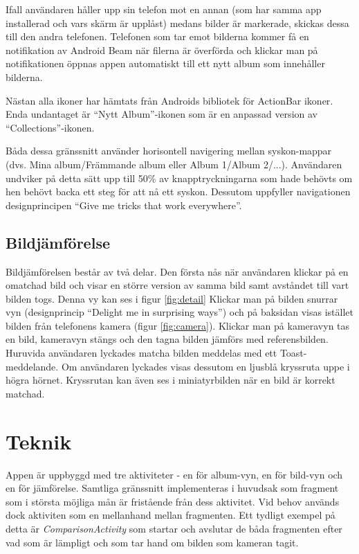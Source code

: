 \documentclass[11px, a4paper]{article}
\begin{document}
	Ifall användaren håller upp sin telefon mot en annan (som har samma app installerad och vars skärm är upplåst) medans bilder är markerade, skickas dessa till den andra telefonen. Telefonen som tar emot bilderna kommer få en notifikation av Android Beam när filerna är överförda och klickar man på notifikationen öppnas appen automatiskt till ett nytt album som innehåller bilderna.

	Nästan alla ikoner har hämtats från Androids bibliotek för ActionBar ikoner\cite{Icons}. Enda undantaget är ``Nytt Album''-ikonen som är en anpassad version av ``Collections''-ikonen.

	Båda dessa gränssnitt använder horisontell navigering mellan syskon-mappar (dvs. Mina album/Främmande album eller Album 1/Album 2/...). Användaren undviker på detta sätt upp till 50\% av knapptryckningarna som hade behövts om hen behövt backa ett steg för att nå ett syskon. Dessutom uppfyller navigationen designprincipen ``Give me tricks that work everywhere''\cite{Principles}.



\subsection{Bildjämförelse}
	Bildjämförelsen består av två delar. Den första nås när användaren klickar på en omatchad bild och visar en större version av samma bild samt avståndet till vart bilden togs. Denna vy kan ses i figur \ref{fig:detail} Klickar man på bilden snurrar vyn (designprincip ``Delight me in surprising ways''\cite{Principles}) och på baksidan visas istället bilden från telefonens kamera (figur \ref{fig:camera}). Klickar man på kameravyn tas en bild, kameravyn stängs och den tagna bilden jämförs med referensbilden. Huruvida användaren lyckades matcha bilden meddelas med ett Toast-meddelande. Om användaren lyckades visas dessutom en ljusblå kryssruta uppe i högra hörnet. Kryssrutan kan även ses i miniatyrbilden när en bild är korrekt matchad.


\section{Teknik}

	Appen är uppbyggd med tre aktiviteter - en för album-vyn, en för bild-vyn och en för jämförelse.	Samtliga gränssnitt implementeras i huvudsak som fragment som i största möjliga mån är fristående från dess aktivitet. Vid behov används dock aktiviten som en mellanhand mellan fragmenten\cite{FragmentCommunication}. Ett tydligt exempel på detta är \emph{ComparisonActivity} som startar och avslutar de båda fragmenten efter vad som är lämpligt och som tar hand om bilden som kameran tagit.
\end{document}
